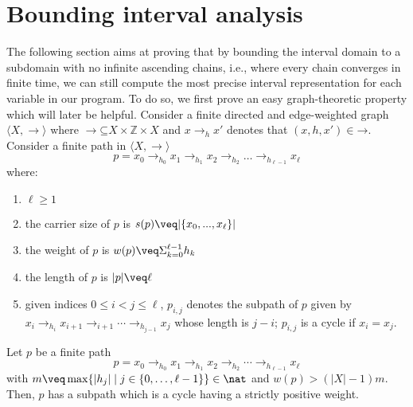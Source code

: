 \section{Bounding interval analysis}\label{sec:computing}
The following section aims at proving that by bounding the interval
domain to a subdomain with no infinite ascending chains, i.e., where
every chain converges in finite time, we can still compute the most
precise interval representation for each variable in our program.  To
do so, we first prove an easy graph-theoretic property which will
later be helpful.
Consider a finite directed and edge-weighted graph
\(\langle X,\to\rangle\) where
\(\to \mathord{\subseteq} X \times \mathbb{Z} \times X\) and
\(x \to_h x'\) denotes that \((x, h, x') \in \mathbin{\to}\). Consider
a finite path in \(\langle X,\to\rangle\)
\[p= x_0 \to_{h_0} x_1 \to_{h_1} x_2 \to_{h_2} \ldots \to_{h_{\ell-1}}
  x_{\ell}\] where:
\begin{enumerate}[label=(\roman*).]
\item \(\ell\geq 1\)
\item the carrier size of \(p\) is \(s(p) \veq |\{x_0,...,x_\ell\}|\)
\item the weight of \(p\) is \(w(p) \veq \Sigma_{k=0}^{\ell-1} h_k\)
\item the length of \(p\) is \(|p|\veq \ell\)
\item given indices \(0 \leq i < j \leq \ell\), \(p_{i,j}\) denotes
  the subpath of \(p\) given by
  \(x_i \to_{h_i} x_{i+1} \to_{i+1} \cdots \to_{h_{j-1}} x_j\) whose
  length is \(j-i\); \(p_{i,j}\) is a cycle if \(x_i=x_j\).
\end{enumerate}

\begin{lemma}
  \label{le:cycles}
  Let \(p\) be a finite path
  \[p = x_0 \to_{h_0} x_1 \to_{h_1} x_2 \to_{h_2} \cdots \to_{h_{\ell-1}} x_{\ell}\]
  with
  \(m \veq \max \{ |h_j| \mid j \in \{0, \ldots, \ell-1\}\}\in \nat\) and 
  \(w(p) > (|X|-1)m\). Then, \(p\) has a subpath which is a cycle having a 
  strictly positive weight.
\end{lemma}

